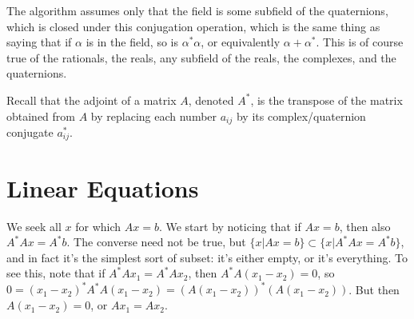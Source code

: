 \documentclass{article}
\begin{document}
The algorithm assumes only that the field is some subfield of the quaternions, which is closed under this conjugation operation, which is the same thing as saying that if \begin{math}{}\alpha\end{math} is in the field, so is \begin{math}{}\alpha^*\alpha\end{math}, or equivalently \begin{math}{}\alpha + \alpha^*\end{math}. This is of course true of the rationals, the reals, any subfield of the reals, the complexes, and the quaternions.

Recall that the adjoint of a matrix \begin{math}A\end{math}, denoted \begin{math}A^*\end{math}, is the transpose of the matrix obtained from \begin{math}A\end{math} by replacing each number \begin{math}{}a_{ij}\end{math} by its complex/quaternion conjugate \begin{math}{}a_{ij}^*\end{math}.

\section{Linear Equations}

We seek all \begin{math}{}x\end{math} for which \begin{math}{}Ax=b\end{math}. We start by noticing that if
\begin{math}{}Ax=b\end{math}, then also \begin{math}{}A^*Ax=A^*b\end{math}. The converse need not be true,
but \begin{math}{}\{x|Ax=b\} \subset \{x|A^*Ax = A^*b\}\end{math}, and in fact it's the simplest sort of subset:
it's either empty, or it's everything. To see this, note that if \begin{math}{}A^*Ax_1 = A^*Ax_2 \end{math},
then \begin{math}{}A^*A(x_1-x_2)=0 \end{math}, so \begin{math}{}0=(x_1-x_2)^*A^*A(x_1-x_2)=(A(x_1-x_2))^*(A(x_1-x_2)) \end{math}. But then \begin{math}{}A(x_1-x_2)=0 \end{math}, or \begin{math}{}Ax_1 = Ax_2 \end{math}.
\end{document}
